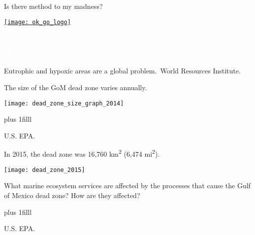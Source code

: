 \documentclass[t]{beamer}
\begin{document}

\begin{frame}[c]{Is there method to my madness?}

\begin{center}
	\href{https://www.youtube.com/watch?v=qybUFnY7Y8w}{\texttt{[image: ok\_go\_logo]}}

\end{center}

\end{frame}


{
\begin{frame}[b]

\hfill\tiny\textcolor{white}{Public domain, Wikimedia Commons.}
\end{frame}
}

{
\begin{frame}[b]%

\tiny\textcolor{white}{ Bill Meier, Flickr Creative Commons.}
\end{frame}
}

{
\begin{frame}[b]


\hspace*{122mm}
\end{frame}
}

{
\begin{frame}[b]{Eutrophic and hypoxic areas are a global problem.}
\hfill\tiny\textcopyright\,World Resources Institute.
\end{frame}
}

\begin{frame}[t]{The size of the GoM dead zone varies annually.}

	\texttt{[image: dead\_zone\_size\_graph\_2014]}
	
	\vskip0pt plus 1filll

\hfill\tiny U.S. EPA.
\end{frame}

\begin{frame}[t]{In 2015, the dead zone was 16,760 km\textsuperscript{2} (6,474 mi\textsuperscript{2}).}

	\texttt{[image: dead\_zone\_2015]}
	
	{\large What marine ecosystem services are affected by the processes that cause the Gulf of Mexico dead zone? How are they affected?}
	
	\vskip0pt plus 1filll

\hfill\tiny U.S. EPA.
\end{frame}
\end{document}
